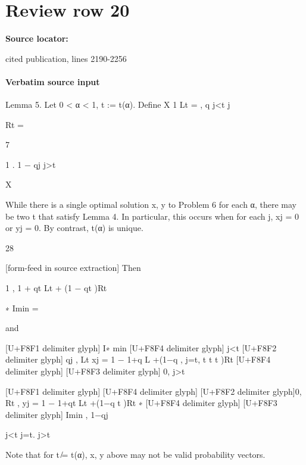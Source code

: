 \documentclass[10pt]{article}
\begin{document}
\section*{Review row 20}
\textbf{Source locator:} {\footnotesize\raggedright cited publication, lines 2190-\allowbreak{}2256\par}
\paragraph{Verbatim source input}
\begin{ReviewVerbatim}
Lemma 5. Let 0 < α < 1, t := t(α). Define
X 1
Lt =
,
q
j<t j

Rt =

7

1
.
1 − qj
j>t

X

While there is a single optimal solution x, y to Problem 6 for each α, there may be two t that satisfy Lemma
4. In particular, this occurs when for each j, xj = 0 or yj = 0. By contrast, t(α) is unique.

28


[form-feed in source extraction]
Then

1
,
1 + qt Lt + (1 − qt )Rt

∗
Imin
=

and

[U+F8F1 delimiter glyph] I∗
min
[U+F8F4 delimiter glyph]
j<t
[U+F8F2 delimiter glyph] qj ,
Lt
xj = 1 − 1+q L +(1−q
, j=t,
t t
t )Rt
[U+F8F4 delimiter glyph]
[U+F8F3 delimiter glyph]
0,
j>t

[U+F8F1 delimiter glyph]
[U+F8F4 delimiter glyph]
[U+F8F2 delimiter glyph]0,
Rt
,
yj = 1 − 1+qt Lt +(1−q
t )Rt
∗
[U+F8F4 delimiter glyph]
[U+F8F3 delimiter glyph] Imin ,
1−qj

j<t
j=t.
j>t

Note that for t ̸= t(α), x, y above may not be valid probability vectors.
\end{ReviewVerbatim}
\end{document}
